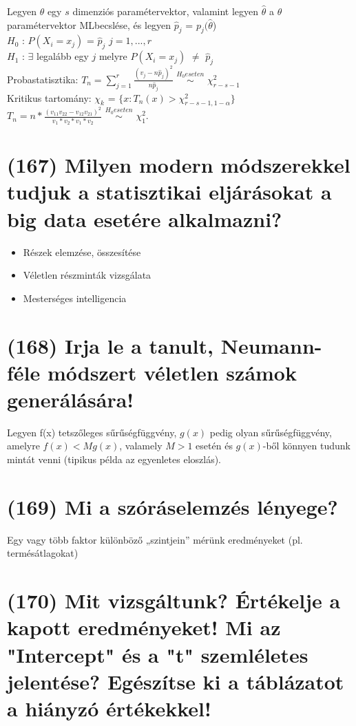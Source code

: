 \documentclass[12p]{article}
\begin{document}
Legyen $\theta$ egy $s$ dimenziós paramétervektor, valamint legyen $\hat{\theta}$ a $\theta$ paramétervektor MLbecslése, és legyen $\hat{p}_j$ = $p_j (\hat{\theta}$)\\
$H_0$ : $P(X_i = x_j)$ = $\hat{p}_j$ $j = 1,. . . , r$\\
$H_1$ : $\exists$ legalább egy $j$ melyre $P(X_i = x_j)$ $\neq$ $\hat{p}_j$\\
Probastatisztika: $T_n = \displaystyle{\sum_{j=1}^{r}}\frac{(v_j - n\hat{p}_j)^2}{n\hat{p}_j}$ $\stackrel{H_0 eseten}{\sim}$ $\chi^2_{r-s-1}$\\
Kritikus tartomány: $\chi_k$ = $\{x: T_n(x) > \chi^2_{r-s-1,1-\alpha}\}$\\
$T_n = n * \frac{(v_{11}v_{22} - v_{12}v_{21})^2}{v_1 * v_2 * v_1 * v_2}$ $\stackrel{H_0 eseten}{\sim}$ $\chi^2_1$.



\section{(167) Milyen modern módszerekkel tudjuk a statisztikai eljárásokat a big data esetére alkalmazni?}

\begin{itemize}
\item Részek elemzése, összesítése
\item Véletlen részminták vizsgálata
\item Mesterséges intelligencia
\end{itemize}


\section{(168) Irja le a tanult, Neumann-féle módszert véletlen számok generálására!}
Legyen f(x) tetszőleges sűrűségfüggvény, $g(x)$ pedig olyan sűrűségfüggvény, amelyre $f(x) < Mg(x)$, valamely $M>1$ esetén és $g(x)$-ből könnyen tudunk mintát venni (tipikus példa az egyenletes eloszlás).

\section{(169) Mi a szóráselemzés lényege?}
Egy vagy több faktor különböző „szintjein” mérünk eredményeket (pl. termésátlagokat)


\section{(170) Mit vizsgáltunk? Értékelje a kapott eredményeket! Mi az "Intercept" és a "t" szemléletes
jelentése? Egészítse ki a táblázatot a hiányzó értékekkel!}
\end{document}
